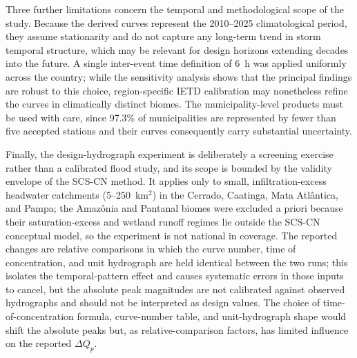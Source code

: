 \documentclass[a4paper,fleqn]{cas-sc}
\begin{document}
Three further limitations concern the temporal and methodological
scope of the study. Because the derived curves represent the
2010–2025 climatological period, they assume stationarity and do not
capture any long-term trend in storm temporal structure, which may be
relevant for design horizons extending decades into the future. A
single inter-event time definition of 6~h was applied uniformly across
the country; while the sensitivity analysis shows that the principal
findings are robust to this choice, region-specific IETD calibration
may nonetheless refine the curves in climatically distinct biomes.
The municipality-level products must be used with care, since
97.3\% of municipalities are represented by fewer than five accepted
stations and their curves consequently carry substantial uncertainty.

Finally, the design-hydrograph experiment is deliberately a screening
exercise rather than a calibrated flood study, and its scope is bounded
by the validity envelope of the SCS-CN method. It applies only to small,
infiltration-excess headwater catchments (5–250~km$^2$) in the Cerrado,
Caatinga, Mata Atlântica, and Pampa; the Amazônia and Pantanal biomes
were excluded a priori because their saturation-excess and wetland
runoff regimes lie outside the SCS-CN conceptual model, so the
experiment is not national in coverage. The reported changes are
relative comparisons in which the curve number, time of concentration,
and unit hydrograph are held identical between the two runs; this
isolates the temporal-pattern effect and causes systematic errors in
those inputs to cancel, but the absolute peak magnitudes are not
calibrated against observed hydrographs and should not be interpreted as
design values. The choice of time-of-concentration formula, curve-number
table, and unit-hydrograph shape would shift the absolute peaks but, as
relative-comparison factors, has limited influence on the reported
$\Delta Q_p$.
\end{document}

